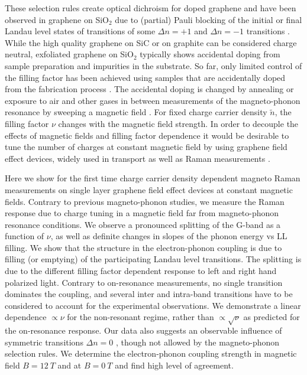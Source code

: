 \documentclass[prl,aps,superscriptaddress,showpacs,reprint]{revtex4-1}
\begin{document}
These selection rules create optical dichroism for doped graphene \cite{goerbig2007filling,ando2007magnetic} and have been observed in graphene on SiO$_2$ due to (partial) Pauli blocking of the initial or final Landau level states of transitions of some  $\Delta n=+1$ and $\Delta n=-1$ transitions \cite{PhysRevLett.110.227402,kossacki2012circular}. While the high quality graphene on SiC or on graphite can be considered charge neutral, exfoliated graphene on SiO$_2$ typically shows accidental doping from sample preparation and impurities in the substrate. So far, only limited control of the filling factor has been achieved using samples that are accidentally doped from the fabrication process \cite{kossacki2012circular}. The accidental doping is changed by annealing or exposure to air and other gases in between measurements of the magneto-phonon resonance by sweeping a magnetic field \cite{PhysRevLett.110.227402}.
For fixed charge carrier density $\widetilde{n}$, the filling factor $\nu$ changes with the magnetic field strength. In order to decouple the effects of magnetic fields and filling factor dependence it would be desirable to tune the number of charges at constant magnetic field by using graphene field effect devices, widely used in transport \cite{novoselov2004electric,novoselov2005two,zhang2005experimental} as well as Raman measurements \cite{pisana2007breakdown,yan2007electric,stampfer2007raman}.

Here we show for the first time charge carrier density dependent magneto Raman measurements on single layer graphene field effect devices at constant magnetic fields. Contrary to previous magneto-phonon studies, we measure the Raman response due to charge tuning in a magnetic field far from magneto-phonon resonance conditions. We observe a pronounced splitting of the G-band as a function of $\nu$, as well as definite changes in slopes of the phonon energy vs LL filling. We show that the structure in the electron-phonon coupling is due to filling (or emptying) of the participating Landau level transitions. The splitting is due to the different filling factor dependent response to left and right hand polarized light. Contrary to on-resonance measurements, no single transition dominates the coupling, and several inter and intra-band transitions have to be considered to account for the experimental observations.
We demonstrate a linear dependence $\propto \nu$ for the non-resonant regime, rather than $\propto \sqrt{\nu}$ as predicted for the on-resonance response.  Our data also suggests an observable influence of symmetric transitions $\Delta n=0$ \cite{kuhne2012polarization}, though not allowed by the magneto-phonon selection rules. We determine the electron-phonon coupling strength in magnetic field  $B=12\: T$ and at $B=0\: T$ and find high level of agreement.
\end{document}
